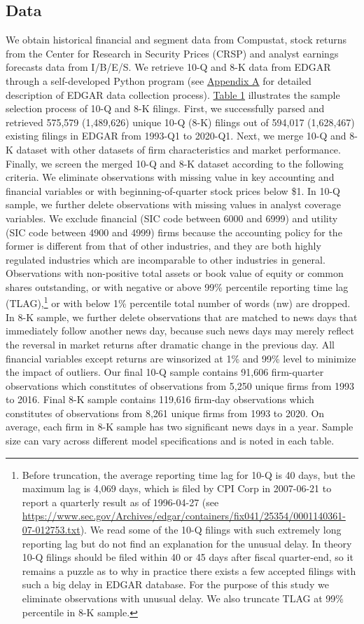 \documentclass[a4paper]{article}
\begin{document}
\begin{spacing}{2}
\subsection{Data}
We obtain historical financial and segment data from Compustat, stock returns from the Center for Research in Security Prices (CRSP) and analyst earnings forecasts data from I/B/E/S. We retrieve 10-Q and 8-K data from EDGAR through a self-developed Python program (see \hyperref[appa]{Appendix A} for detailed description of EDGAR data collection process). \hyperref[T1]{Table 1} illustrates the sample selection process of 10-Q and 8-K filings. First, we successfully parsed and retrieved 575,579 (1,489,626) unique 10-Q (8-K) filings out of 594,017 (1,628,467) existing filings in EDGAR from 1993-Q1 to 2020-Q1. Next, we merge 10-Q and 8-K dataset with other datasets of firm characteristics and market performance. Finally, we screen the merged 10-Q and 8-K dataset according to the following criteria. We eliminate observations with missing value in key accounting and financial variables or with beginning-of-quarter stock prices below \$1. In 10-Q sample, we further delete observations with missing values in analyst coverage variables. We exclude financial (SIC code between 6000 and 6999) and utility (SIC code between 4900 and 4999) firms because the accounting policy for the former is different from that of other industries, and they are both highly regulated industries which are incomparable to other industries in general. Observations with non-positive total assets or book value of equity or common shares outstanding, or with negative or above 99\% percentile reporting time lag (TLAG),\footnote{Before truncation, the average reporting time lag for 10-Q is 40 days, but the maximum lag is 4,069 days, which is filed by CPI Corp in 2007-06-21 to report a quarterly result as of 1996-04-27 (see \url{https://www.sec.gov/Archives/edgar/containers/fix041/25354/0001140361-07-012753.txt}). We read some of the 10-Q filings with such extremely long reporting lag but do not find an explanation for the unusual delay. In theory 10-Q filings should be filed within 40 or 45 days after fiscal quarter-end, so it remains a puzzle as to why in practice there exists a few accepted filings with such a big delay in EDGAR database. For the purpose of this study we eliminate observations with unusual delay. We also truncate TLAG at 99\% percentile in 8-K sample.} or with below 1\% percentile total number of words (nw) are dropped. In 8-K sample, we further delete observations that are matched to news days that immediately follow another news day, because such news days may merely reflect the reversal in market returns after dramatic change in the previous day. All financial variables except returns are winsorized at 1\% and 99\% level to minimize the impact of outliers. Our final 10-Q sample contains 91,606 firm-quarter observations which constitutes of observations from 5,250 unique firms from 1993 to 2016. Final 8-K sample contains 119,616 firm-day observations which constitutes of observations from 8,261 unique firms from 1993 to 2020. On average, each firm in 8-K sample has two significant news days in a year. Sample size can vary across different model specifications and is noted in each table. 


\end{spacing}
\end{document}
